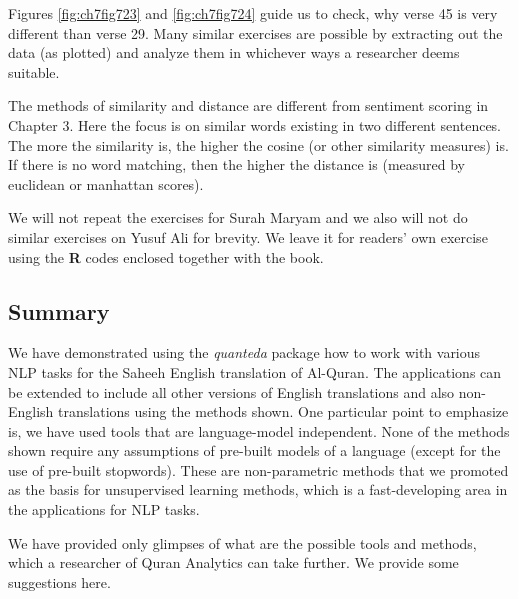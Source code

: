 \documentclass[
]{article}
\begin{document}
Figures \ref{fig:ch7fig723} and \ref{fig:ch7fig724} guide us to check, why verse 45 is very different than verse 29. Many similar exercises are possible by extracting out the data (as plotted) and analyze them in whichever ways a researcher deems suitable.

The methods of similarity and distance are different from sentiment scoring in Chapter 3. Here the focus is on similar words existing in two different sentences. The more the similarity is, the higher the cosine (or other similarity measures) is. If there is no word matching, then the higher the distance is (measured by euclidean or manhattan scores).

We will not repeat the exercises for Surah Maryam and we also will not do similar exercises on Yusuf Ali for brevity. We leave it for readers' own exercise using the \textbf{R} codes enclosed together with the book.

\hypertarget{summary-chapter-7}{%
\subsection{Summary}\label{summary-chapter-7}}

We have demonstrated using the \emph{quanteda} package how to work with various NLP tasks for the Saheeh English translation of Al-Quran. The applications can be extended to include all other versions of English translations and also non-English translations using the methods shown. One particular point to emphasize is, we have used tools that are language-model independent. None of the methods shown require any assumptions of pre-built models of a language (except for the use of pre-built stopwords). These are non-parametric methods that we promoted as the basis for unsupervised learning methods, which is a fast-developing area in the applications for NLP tasks.

We have provided only glimpses of what are the possible tools and methods, which a researcher of Quran Analytics can take further. We provide some suggestions here.
\end{document}
